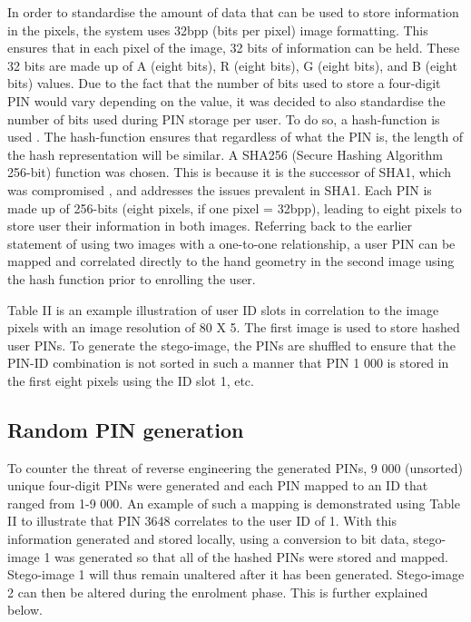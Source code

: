 
In order to standardise the amount of data that can be used to store information in the pixels, the system uses 32bpp (bits per pixel) image formatting. This ensures that in each pixel of the image, 32 bits of information can be held. These 32 bits are made up of A (eight bits), R (eight bits), G (eight bits), and B (eight bits) values. Due to the fact that the number of bits used to store a four-digit PIN would vary depending on the value, it was decided to also standardise the number of bits used during PIN storage per user. To do so, a hash-function is used \citep{Kashyap2016}. 
The hash-function ensures that regardless of what the PIN is, the length of the hash representation will be similar. A SHA256 (Secure Hashing Algorithm 256-bit) function was chosen. This is because it is the successor of SHA1, which was compromised \citep{Brandom}, and addresses the issues prevalent in SHA1.
Each PIN is made up of 256-bits (eight pixels, if one pixel = 32bpp), leading to eight pixels to store user their information in both images. Referring back to the earlier statement of using two images with a one-to-one relationship, a user PIN can be mapped and correlated directly to the hand geometry in the second image using the hash function prior to enrolling the user.

Table II is an example illustration of user ID slots in correlation to the image pixels with an image resolution of 80 X 5. The first image is used to store hashed user PINs. 
To generate the stego-image, the PINs are shuffled to ensure that the PIN-ID combination is not sorted in such a manner that PIN 1 000 is stored in the first eight pixels using the ID slot 1, etc.

\subsection{Random PIN generation}

To counter the threat of reverse engineering the generated PINs, 9 000 (unsorted) unique four-digit PINs were generated and each PIN mapped to an ID that ranged from 1-9 000. An example of such a mapping is demonstrated using Table II to illustrate that PIN 3648 correlates to the user ID of 1. With this information generated and stored locally, using a conversion to bit data, stego-image 1 was generated so that all of the hashed PINs were stored and mapped. Stego-image 1 will thus remain unaltered after it has been generated. Stego-image 2 can then be altered during the enrolment phase. This is further explained below.

